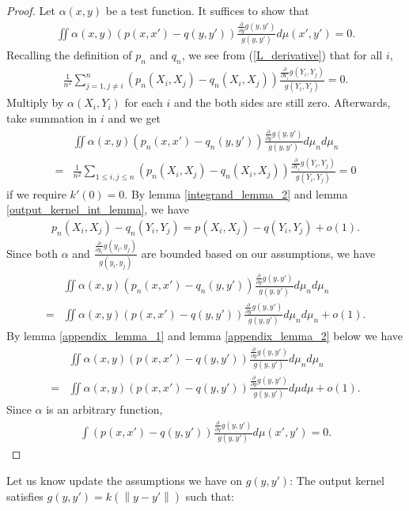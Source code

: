 \documentclass[10pt]{article}
\newcommand{\norm}[1]{\left\lVert#1\right\rVert}
\newenvironment{Proof of lemma}{\noindent{\bf Proof of Lemma}}{\hfill$\Box$\newline}
\newenvironment{Proof of claim}{\noindent{\bf Proof of claim}}{\hfill$\Box$\newline}
\newenvironment{Proof of theorem}{\noindent{\bf Proof of Theorem}}{\hfill\scriptsize{$\Box$}\newline}
\newenvironment{Proof of theorems}{\noindent{\bf Proof of Theorems}}{\hfill$\Box$\newline}
\newenvironment{Proof of proposition}{\noindent{\bf Proof of Proposition}}{\hfill$\Box$\newline}
\newenvironment{Proof of propositions}{\noindent{\bf Proof of Propositions}}{\hfill$\Box$\newline}
\newenvironment{Proof of exercise}{\noindent{\it Proof of Exercise:}}{\hfill$\Box$}
\numberwithin{equation}{section}
\begin{document}
\begin{proof}
    Let $\alpha(x,y)$ be a test function. It suffices to show that
    \begin{align}
        \iint \alpha(x,y)(p(x,x')-q(y,y')) \frac{\frac{\partial}{\partial y}g(y,y')}{g(y,y')} d\mu(x',y') = 0.
    \end{align}
    Recalling the definition of $p_n$ and $q_n$, we see from (\ref{L_derivative}) that for all $i$,
    \begin{align}
        \frac{1}{n^2}\sum_{j=1,j \neq i}^n (p_n(X_i,X_j)-q_n(X_i,X_j)) \frac{\frac{\partial}{\partial Y_i}g(Y_i,Y_j)}{g(Y_i,Y_j)} = 0.
    \end{align}
    Multiply by $\alpha(X_i,Y_i)$ for each $i$ and the both sides are still zero. Afterwards, take summation in $i$ and we get
    \begin{align}
          & \iint \alpha(x,y)(p_n(x,x')-q_n(y,y')) \frac{\frac{\partial}{\partial y}g(y,y')}{g(y,y')} d\mu_n d\mu_n \nonumber                \\
        = & \frac{1}{n^2}\sum_{1 \leq i,j \leq n} (p_n(X_i,X_j)-q_n(X_i,X_j)) \frac{\frac{\partial}{\partial Y_i}g(Y_i,Y_j)}{g(Y_i,Y_j)} = 0
    \end{align}
    if we require $k'(0) = 0$.
    By lemma \ref{integrand_lemma_2} and lemma \ref{output_kernel_int_lemma}, we have
    \begin{align}
        p_n(X_i,X_j)-q_n(Y_i,Y_j) = p(X_i,X_j)-q(Y_i,Y_j) + o(1).
    \end{align}
    Since both $\alpha$ and $\frac{\frac{\partial}{\partial y_i}g(y_i,y_j)}{g(y_i,y_j)}$ are bounded based on our assumptions, we have
    \begin{align}
          & \iint \alpha(x,y)(p_n(x,x')-q_n(y,y')) \frac{\frac{\partial}{\partial y}g(y,y')}{g(y,y')} d\mu_n d\mu_n \nonumber \\
        = & \iint \alpha(x,y)(p(x,x')-q(y,y')) \frac{\frac{\partial}{\partial y}g(y,y')}{g(y,y')} d\mu_n d\mu_n + o(1).
    \end{align}
    By lemma \ref{appendix_lemma_1} and lemma \ref{appendix_lemma_2} below we have
    \begin{align}
          & \iint \alpha(x,y)(p(x,x')-q(y,y')) \frac{\frac{\partial}{\partial y}g(y,y')}{g(y,y')} d\mu_n d\mu_n \nonumber \\
        = & \iint \alpha(x,y)(p(x,x')-q(y,y')) \frac{\frac{\partial}{\partial y}g(y,y')}{g(y,y')} d\mu d\mu + o(1).
    \end{align}
    Since $\alpha$ is an arbitrary function,
    \begin{align}
        \int (p(x,x')-q(y,y')) \frac{\frac{\partial}{\partial y}g(y,y')}{g(y,y')} d\mu(x',y') = 0.
    \end{align}
\end{proof}
Let us know update the assumptions we have on $g(y,y')$:
The output kernel satisfies $g(y,y') = k (\norm{y-y'})$ such that:
\end{document}
